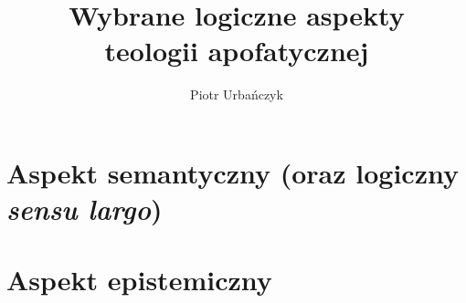 \documentclass[12pt,a4paper,openany,oneside,leqno,titlepage]{report}
\title{Wybrane logiczne aspekty\\teologii apofatycznej}
\author{Piotr Urbańczyk}
\theoremstyle{definition}
\begin{document}
\stronatytulowa

\tableofcontents
\listoffigures

\cleardoublepage


\part{Aspekt semantyczny (oraz logiczny \textit{sensu largo})}





\part{Aspekt epistemiczny}




%

%
%
\end{document}
